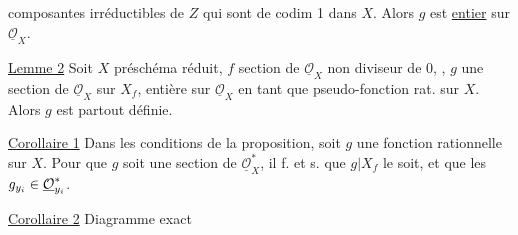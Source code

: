 composantes irréductibles de $Z$ qui sont de codim 1 dans $X$. Alors $g$ est \uline{entier} sur $\underline{\mathcal O}_X$.

\uline{Lemme 2} Soit   $X$  préschéma  réduit, $f$ section de $\underline{\mathcal O}_X$ non diviseur de 0, , $g$ une section de $\underline{\mathcal O}_X$ sur $X_f$, entière sur $\underline{\mathcal O}_X$ en tant que  pseudo-fonction rat. sur $X$. Alors $g$ est partout définie.


\uline{Corollaire 1} Dans les conditions de la proposition, soit $g$ une fonction rationnelle sur $X$. Pour que $g$ soit une section de $\underline{\mathcal O}_X^*$, il f. et s. que $g|X_f$ le soit, et que  les $g_{y_i}\in\underline{\mathcal O}_{y_i}^*$. 
\margin{$\longrightarrow$}

\uline{Corollaire 2} Diagramme exact
